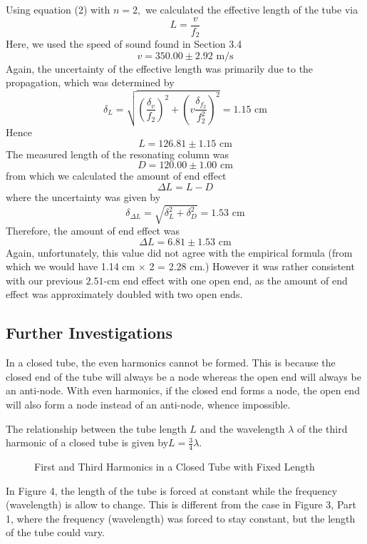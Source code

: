 \begin{itemize}
		Using equation (2) with $n=2,$ we calculated the effective length of the tube via
		$$
		L = \frac v {f_2}
		$$
		Here, we used the speed of sound found in Section 3.4
		$$
		v = 350.00\pm2.92\text{ m/s}
		$$
		Again, the uncertainty of the effective length was primarily due to the propagation, which was determined by
		$$
		\delta_{L}=\sqrt{
			\left(\frac{\delta_{v}}{f_2}\right)^2+
			\left(v\frac{\delta_{f_2}}{f_2^2}\right)^2
		}=1.15\text{ cm}
		$$
		Hence
		$$
		L = 126.81 \pm{1.15} \text{ cm}
		$$
		The measured length of the resonating column was
		$$
		D = 120.00 \pm 1.00\text{ cm}
		$$
		from which we calculated the amount of end effect
		$$
		\Delta{L} = L - D
		$$
		where the uncertainty was given by
		$$
		\delta_{\Delta L}=\sqrt{
	\delta_L^2+\delta_D^2
	} = 1.53\text{ cm}
		$$
		Therefore, the amount of end effect was
		$$
		\Delta L = 6.81 \pm 1.53\text{ cm}
		$$
		Again, unfortunately, this value did not agree with the empirical formula (from which we would have 1.14 cm $\times$ 2 = 2.28 cm.) However it was rather consistent with our previous $2.51$-cm end effect with one open end, as the amount of end effect was approximately doubled with two open ends.
\end{itemize}

\subsection{Further Investigations}
In a closed tube, the even harmonics cannot be formed. This is because the closed end of the tube will always be a node whereas the open end will always be an anti-node. With even harmonics, if the closed end forms a node, the open end will also form a node instead of an anti-node, whence impossible.

The relationship between the tube length $L$ and the wavelength $\lambda$ of the third harmonic of a closed tube is given by$
L = \frac34\lambda.
$
\newpage
\begin{figure}[!htb]
	\caption{First and Third Harmonics in a Closed Tube with Fixed Length}
\end{figure}
In Figure 4, the length of the tube is forced at constant while the frequency (wavelength) is allow to change. This is different from the case in Figure 3, Part 1, where the frequency (wavelength) was forced to stay constant, but the length of the tube could vary.
\appendix
